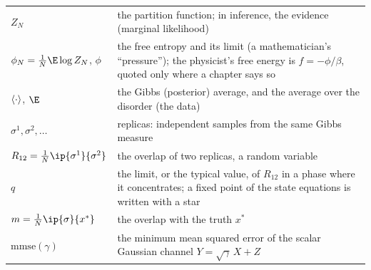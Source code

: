 
\begin{tabular}{@{}p{}p{}@{}}
$Z_N$ & the partition function; in inference, the evidence (marginal likelihood) \\
$\phi_N=\frac1N\E\log Z_N$, $\phi$ & the free entropy and its limit (a mathematician's ``pressure''); the physicist's free energy is $f=-\phi/\beta$, quoted only where a chapter says so \\
$\left\langle \cdot\right\rangle$, $\E$ & the Gibbs (posterior) average, and the average over the disorder (the data) \\
$\sigma^1,\sigma^2,\dots$ & replicas: independent samples from the same Gibbs measure \\
$R_{12}=\frac1N\ip{\sigma^1}{\sigma^2}$ & the overlap of two replicas, a random variable \\
$q$ & the limit, or the typical value, of $R_{12}$ in a phase where it concentrates; a fixed point of the state equations is written with a star \\
$m=\frac1N\ip{\sigma}{x^*}$ & the overlap with the truth $x^*$ \\
$\mathrm{mmse}(\gamma)$ & the minimum mean squared error of the scalar Gaussian channel $Y=\sqrt\gamma\,X+Z$
\end{tabular}


